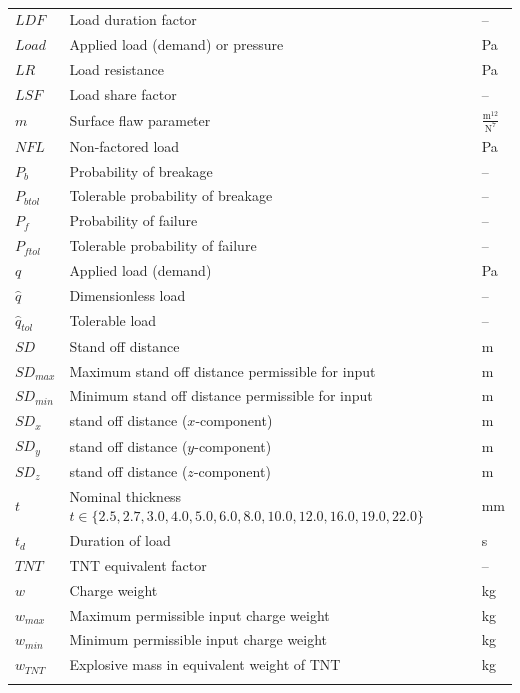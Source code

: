 \documentclass[12pt]{article}
\begin{document}
\begin{longtabu}{l X[l] l}
$LDF$ & Load duration factor & --
\\
$Load$ & Applied load (demand) or pressure & Pa
\\
$LR$ & Load resistance & Pa
\\
$LSF$ & Load share factor & --
\\
$m$ & Surface flaw parameter & $\frac{\text{m}^{12}}{\text{N}^{7}}$
\\
$NFL$ & Non-factored load & Pa
\\
${P_{b}}$ & Probability of breakage & --
\\
${P_{btol}}$ & Tolerable probability of breakage & --
\\
${P_{f}}$ & Probability of failure & --
\\
${P_{ftol}}$ & Tolerable probability of failure & --
\\
$q$ & Applied load (demand) & Pa
\\
$\hat{q}$ & Dimensionless load & --
\\
${\hat{q}_{tol}}$ & Tolerable load & --
\\
$SD$ & Stand off distance & m
\\
${SD_{max}}$ & Maximum stand off distance permissible for input & m
\\
${SD_{min}}$ & Minimum stand off distance permissible for input & m
\\
${SD_{x}}$ & stand off distance ($x$-component) & m
\\
${SD_{y}}$ & stand off distance ($y$-component) & m
\\
${SD_{z}}$ & stand off distance ($z$-component) & m
\\
$t$ & Nominal thickness $t\in{}\{2.5,2.7,3.0,4.0,5.0,6.0,8.0,10.0,12.0,16.0,19.0,22.0\}$ & mm
\\
${t_{d}}$ & Duration of load & s
\\
$TNT$ & TNT equivalent factor & --
\\
$w$ & Charge weight & kg
\\
${w_{max}}$ & Maximum permissible input charge weight & kg
\\
${w_{min}}$ & Minimum permissible input charge weight & kg
\\
${w_{TNT}}$ & Explosive mass in equivalent weight of TNT & kg
\\
\bottomrule
\caption{}
\label{Table:ToS}
\end{longtabu}
\end{document}
